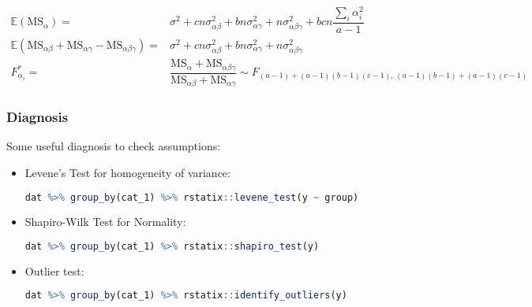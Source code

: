 \begin{enumerate}[topsep=2pt,itemsep=2pt]
    \begin{align}
        \mathbb{E}\left( \mathrm{MS}_\alpha   \right)=&\sigma ^2+cn\sigma ^2_{\alpha \beta }+bn\sigma ^2_{\alpha \gamma}+n\sigma ^2_{\alpha \beta \gamma }+bcn\dfrac{\sum_{i}\alpha _i^2}{a-1} \\
        \mathbb{E}\left( \mathrm{MS}_{\alpha \beta }+\mathrm{MS}_{\alpha \gamma }-\mathrm{MS}_{\alpha \beta \gamma }    \right)=& \sigma ^2+cn\sigma ^2_{\alpha \beta }+bn\sigma ^2_{\alpha \gamma}+n\sigma ^2_{\alpha \beta \gamma }\\
        F^*_{\alpha _i}=&\dfrac{\mathrm{MS}_\alpha+\mathrm{MS}_{\alpha \beta \gamma }}{\mathrm{MS}_{\alpha \beta }+\mathrm{MS}_{\alpha \gamma }}\sim F_{(a-1)+(a-1)(b-1)(c-1),\,(a-1)(b-1)+(a-1)(c-1)} 
    \end{align}

    
    
\end{enumerate}

    





\subsubsection{Diagnosis}\label{SubSubSectionDiagnosticsToFactorModel}

Some useful diagnosis to check assumptions:
\begin{itemize}[topsep=2pt,itemsep=0pt]
    \item Levene's Test for homogeneity of variance: 
    \begin{rcode}
    \begin{lstlisting}[language=R]
dat %>% group_by(cat_1) %>% rstatix::levene_test(y ~ group)
    \end{lstlisting}
    \end{rcode}
    \item Shapiro-Wilk Test for Normality:
    \begin{rcode}
    \begin{lstlisting}[language=R]
dat %>% group_by(cat_1) %>% rstatix::shapiro_test(y)
    \end{lstlisting}
    \end{rcode}
    \item Outlier test:
    \begin{rcode}
    \begin{lstlisting}[language=R]
dat %>% group_by(cat_1) %>% rstatix::identify_outliers(y)
    \end{lstlisting}
    \end{rcode}
\end{itemize}

